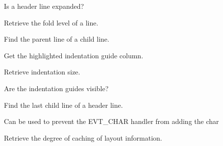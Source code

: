 \label{wxstyledtextctrlgetfoldexpanded}


Is a header line expanded?


\label{wxstyledtextctrlgetfoldlevel}


Retrieve the fold level of a line.


\label{wxstyledtextctrlgetfoldparent}


Find the parent line of a child line.


\label{wxstyledtextctrlgethighlightguide}


Get the highlighted indentation guide column.


\label{wxstyledtextctrlgetindent}


Retrieve indentation size.


\label{wxstyledtextctrlgetindentationguides}


Are the indentation guides visible?


\label{wxstyledtextctrlgetlastchild}


Find the last child line of a header line.


\label{wxstyledtextctrlgetlastkeydownprocessed}


Can be used to prevent the EVT\_CHAR handler from adding the char


\label{wxstyledtextctrlgetlayoutcache}


Retrieve the degree of caching of layout information.


